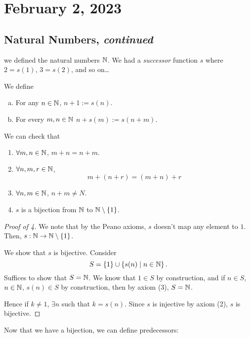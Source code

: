 \section{February 2, 2023}
\subsection{Natural Numbers, \emph{continued}}
\recall we defined the natural numbers $\mathbb N$. We had a \emph{successor} function $s$ where $2 = s(1)$, $3 = s(2)$, and so on\dots

\begin{definition}
    We define
    \begin{enumerate}[a.]
        \item For any $n\in \mathbb N$, $n+1 := s(n)$.
        \item For every $m, n\in\mathbb N$ $n + s(m) := s(n + m)$.
    \end{enumerate}
\end{definition}

\begin{proposition}
    We can check that
    \begin{enumerate}
        \item $\forall m, n\in \mathbb N$, $m+n = n+m$.
        \item $\forall n, m, r\in\mathbb N$,
              \[m + (n + r) = (m + n) + r\]
        \item $\forall n, m\in \mathbb N$, $n + m\neq N$.
        \item $s$ is a bijection from $\mathbb N$ to $\mathbb N\setminus\{1\}$.
    \end{enumerate}
\end{proposition}
\begin{proof}[Proof of 4]
    We note that by the Peano axioms, $s$ doesn't map any element to $1$. Then, $s: \mathbb N\to\mathbb N\setminus\{1\}$.

    We show that $s$ is bijective. Consider
    \[S = \{1\}\cup \left\{ s(n)\mid n\in\mathbb N \right\}.\]
    Suffices to show that $S = \mathbb N$. We know that $1\in S$ by construction, and if $n\in S$, $n\in \mathbb N$, $s(n)\in S$ by construction, then by axiom (3), $S = \mathbb N$.

    Hence if $k\neq 1$, $\exists n$ such that $k = s(n)$. Since $s$ is injective by axiom (2), $s$ is bijective.
\end{proof}

Now that we have a bijection, we can define predecessors:

